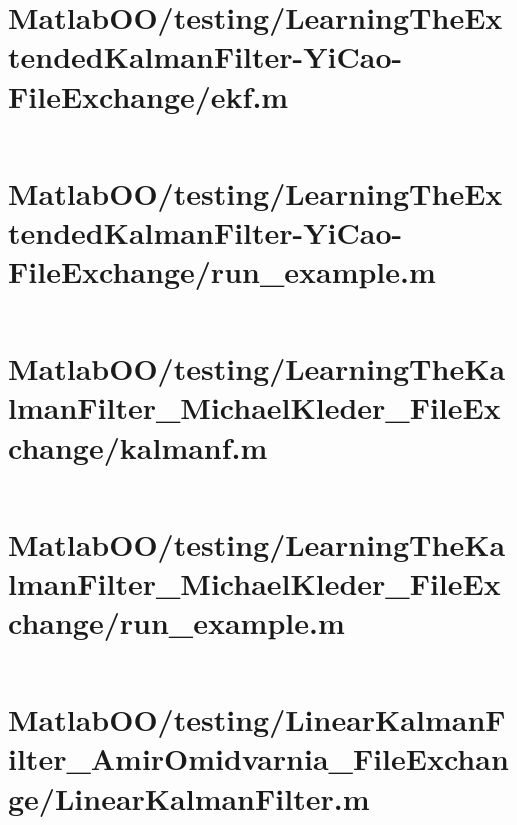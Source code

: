 \pagebreak
\section*{MatlabOO/testing/LearningTheExtendedKalmanFilter-YiCao-FileExchange/ekf.m}\label{code:MatlabOO/testing/LearningTheExtendedKalmanFilter-YiCao-FileExchange/ekf.m}
\inputminted[linenos,fontsize=\scriptsize]{matlab}{/home/dcouture/git/mathyourlife/TSatPy/beta_versions/matlab_object_oriented/testing/LearningTheExtendedKalmanFilter-YiCao-FileExchange/ekf.m}

\pagebreak
\section*{MatlabOO/testing/LearningTheExtendedKalmanFilter-YiCao-FileExchange/run\_example.m}\label{code:MatlabOO/testing/LearningTheExtendedKalmanFilter-YiCao-FileExchange/run_example.m}
\inputminted[linenos,fontsize=\scriptsize]{matlab}{/home/dcouture/git/mathyourlife/TSatPy/beta_versions/matlab_object_oriented/testing/LearningTheExtendedKalmanFilter-YiCao-FileExchange/run_example.m}

\pagebreak
\section*{MatlabOO/testing/LearningTheKalmanFilter\_MichaelKleder\_FileExchange/kalmanf.m}\label{code:MatlabOO/testing/LearningTheKalmanFilter_MichaelKleder_FileExchange/kalmanf.m}
\inputminted[linenos,fontsize=\scriptsize]{matlab}{/home/dcouture/git/mathyourlife/TSatPy/beta_versions/matlab_object_oriented/testing/LearningTheKalmanFilter_MichaelKleder_FileExchange/kalmanf.m}

\pagebreak
\section*{MatlabOO/testing/LearningTheKalmanFilter\_MichaelKleder\_FileExchange/run\_example.m}\label{code:MatlabOO/testing/LearningTheKalmanFilter_MichaelKleder_FileExchange/run_example.m}
\inputminted[linenos,fontsize=\scriptsize]{matlab}{/home/dcouture/git/mathyourlife/TSatPy/beta_versions/matlab_object_oriented/testing/LearningTheKalmanFilter_MichaelKleder_FileExchange/run_example.m}

\pagebreak
\section*{MatlabOO/testing/LinearKalmanFilter\_AmirOmidvarnia\_FileExchange/LinearKalmanFilter.m}\label{code:MatlabOO/testing/LinearKalmanFilter_AmirOmidvarnia_FileExchange/LinearKalmanFilter.m}
\inputminted[linenos,fontsize=\scriptsize]{matlab}{/home/dcouture/git/mathyourlife/TSatPy/beta_versions/matlab_object_oriented/testing/LinearKalmanFilter_AmirOmidvarnia_FileExchange/LinearKalmanFilter.m}

